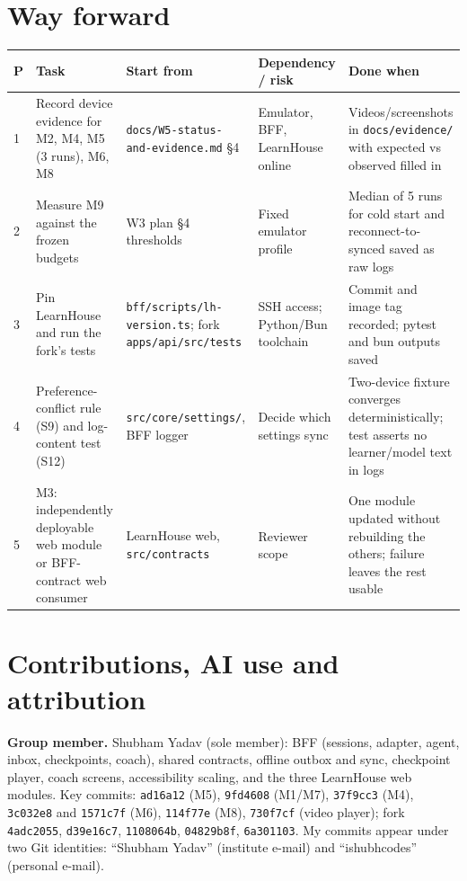 \documentclass[11pt,a4paper]{article}
\newcommand{\fp}[1]{\nolinkurl{#1}}
\begin{document}
\section{Way forward}
\begin{xltabular}{\textwidth}{L{0.04\textwidth}L{0.27\textwidth}L{0.2\textwidth}L{0.17\textwidth}Y}
\toprule
\textbf{P} & \textbf{Task} & \textbf{Start from} & \textbf{Dependency / risk} & \textbf{Done when} \\
 & Record device evidence for M2, M4, M5 (3 runs), M6, M8 & \fp{docs/W5-status-and-evidence.md} §4 & Emulator, BFF, LearnHouse online & Videos/screenshots in \fp{docs/evidence/} with expected vs observed filled in \\
2 & Measure M9 against the frozen budgets & W3 plan §4 thresholds & Fixed emulator profile & Median of 5 runs for cold start and reconnect-to-synced saved as raw logs \\
3 & Pin LearnHouse and run the fork's tests & \fp{bff/scripts/lh-version.ts}; fork \fp{apps/api/src/tests} & SSH access; Python/Bun toolchain & Commit and image tag recorded; pytest and bun outputs saved \\
4 & Preference-conflict rule (S9) and log-content test (S12) & \fp{src/core/settings/}, BFF logger & Decide which settings sync & Two-device fixture converges deterministically; test asserts no learner/model text in logs \\
5 & M3: independently deployable web module or BFF-contract web consumer & LearnHouse web, \fp{src/contracts} & Reviewer scope & One module updated without rebuilding the others; failure leaves the rest usable \\
\bottomrule
\end{xltabular}

\section{Contributions, AI use and attribution}
\textbf{Group member.} Shubham Yadav (sole member): BFF (sessions, adapter, agent, inbox, checkpoints,
coach), shared contracts, offline outbox and sync, checkpoint player, coach screens, accessibility
scaling, and the three LearnHouse web modules. Key commits: \texttt{ad16a12} (M5), \texttt{9fd4608}
(M1/M7), \texttt{37f9cc3} (M4), \texttt{3c032e8} and \texttt{1571c7f} (M6), \texttt{114f77e} (M8),
\texttt{730f7cf} (video player); fork \texttt{4adc2055}, \texttt{d39e16c7}, \texttt{1108064b},
\texttt{04829b8f}, \texttt{6a301103}. My commits appear under two Git identities: ``Shubham Yadav'' (institute e-mail) and
``ishubhcodes'' (personal e-mail).
\end{document}
